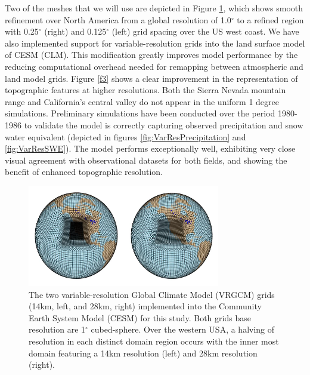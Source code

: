 \documentclass[11pt]{article}
\begin{document}
Two of the meshes that we will use are depicted in Figure \ref{fig:CESMVarResMeshes}, which shows smooth refinement over North America from a global resolution of 1.0$^\circ$ to a refined region with 0.25$^\circ$ (right) and 0.125$^\circ$ (left) grid spacing over the US west coast.  We have also implemented support for variable-resolution grids into the land surface model of CESM (CLM).  This modification greatly improves model performance by the reducing computational overhead needed for remapping between atmospheric and land model grids.  Figure \ref{f3} shows a clear improvement in the representation of topographic features at higher resolutions.  Both the Sierra Nevada mountain range and California's central valley do not appear in the uniform 1 degree simulations.  Preliminary simulations have been conducted over the period 1980-1986 to validate the model is correctly capturing observed precipitation and snow water equivalent (depicted in figures \ref{fig:VarResPrecipitation} and \ref{fig:VarResSWE}).  The model performs exceptionally well, exhibiting very close visual agreement with observational datasets for both fields, and showing the benefit of enhanced topographic resolution.



\begin{figure}
  \begin{center}
  \includegraphics[width=0.75\textwidth]{14kmand28kmgrids}
  \caption{The two variable-resolution Global Climate Model (VRGCM) grids (14km, left, and 28km, right) implemented into the Community Earth System Model (CESM) for this study.  Both grids base resolution are 1$^\circ$ cubed-sphere.  Over the western USA, a halving of resolution in each distinct domain region occurs with the inner most domain featuring a 14km resolution (left) and 28km resolution (right).} \label{fig:CESMVarResMeshes}
  \end{center}
\end{figure}
\end{document}
